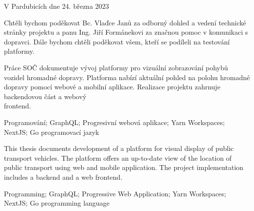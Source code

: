 \vspace{24 pt}

\noindent V Pardubicích dne 24. března 2023 \dotfill{}

\hspace{6.45cm} \authorName

\cleardoublepage

\vspace*{0.8\textheight}

\noindent
Chtěli bychom poděkovat Bc. Vlaďce Janů za odborný dohled a vedení technické stránky projektu a panu Ing. Jiří Formánekovi za značnou pomoc v komunikaci s dopravci. %
Dále bychom chtěli poděkovat všem, kteří se podíleli na testování platformy.

\cleardoublepage


\noindent Práce SOČ dokumentuje vývoj platformy pro vizuální zobrazování pohybů vozidel hromadné dopravy. Platforma nabízí aktuální pohled na polohu hromadné dopravy pomocí webové a mobilní aplikace. Realizace projektu zahrnuje backendovou část a webový \\ frontend.

\vspace{18pt}


\noindent Programování; GraphQL; Progresivní webová aplikace; Yarn Workspaces; NextJS; Go programovací jazyk
\vspace{18pt}


\noindent This thesis documents development of a platform for visual display of public transport vehicles. The platform offers an up-to-date view of the location of public transport using web and mobile application. The project implementation includes a backend and a web frontend.

\vspace{18pt}


\noindent Programming; GraphQL; Progressive Web Application; Yarn Workspaces; NextJS; Go programming language

\cleardoublepage